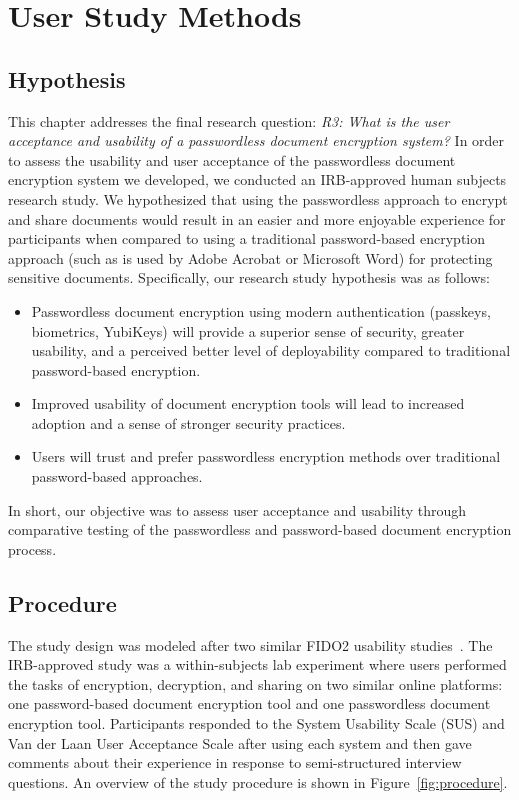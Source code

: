 \chapter{User Study Methods}
\label{ch:user-study}

\section{Hypothesis}
\label{sec:hypothesis}

This chapter addresses the final research question: \emph{R3: What is the user acceptance and usability of a passwordless document encryption system?} In order to assess the usability and user acceptance of the passwordless document encryption system we developed, we conducted an IRB-approved human subjects research study. We hypothesized that using the passwordless approach to encrypt and share documents would result in an easier and more enjoyable experience for participants when compared to using a traditional password-based encryption approach (such as is used by Adobe Acrobat or Microsoft Word) for protecting sensitive documents. Specifically, our research study hypothesis was as follows:

\begin{itemize}
    \item Passwordless document encryption using modern authentication (passkeys, biometrics, YubiKeys) will provide a superior sense of security, greater usability, and a perceived better level of deployability compared to traditional password-based encryption.
    \item Improved usability of document encryption tools will lead to increased adoption and a sense of stronger security practices.
    \item Users will trust and prefer passwordless encryption methods over traditional password-based approaches.
\end{itemize}

In short, our objective was to assess user acceptance and usability through comparative testing of the passwordless and password-based document encryption process.

\section{Procedure}
\label{sec:procedure}

The study design was modeled after two similar FIDO2 usability studies~\cite{lyastani_fido2_2020,wursching_fido2_2023}. The IRB-approved study was a within-subjects lab experiment where users performed the tasks of encryption, decryption, and sharing on two similar online platforms: one password-based document encryption tool and one passwordless document encryption tool. Participants responded to the System Usability Scale (SUS) and Van der Laan User Acceptance Scale after using each system and then gave comments about their experience in response to semi-structured interview questions. An overview of the study procedure is shown in Figure~\ref{fig:procedure}.

